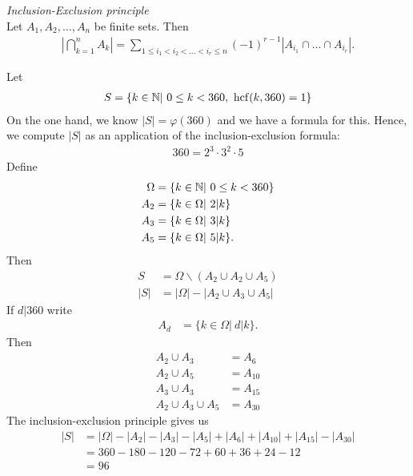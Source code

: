 \begin{pp}
	\emph{Inclusion-Exclusion principle} \\
	Let $A_1, A_2, \dots, A_n$ be finite sets. Then
	\begin{align*}
	\left| \bigcap_{k=1}^n A_k \right| = \sum_{1 \le i_1 < i_2 < \dots < i_r \le n} (-1)^{r-1} \left| A_{i_1} \cap \dots \cap A_{i_r} \right|.
	\end{align*}
\end{pp}


\begin{ex}
	Let 
	\begin{align*}
	S = \{ k \in \mathbb N |~ 0 \le k < 360, ~\operatorname{hcf}(k,360) = 1 \}
	\end{align*}
	On the one hand, we know $|S| = \varphi(360)$ and we have a formula for this. Hence, we compute $|S|$ as an application of the inclusion-exclusion formula:
	\begin{align*}
	360 = 2^3 \cdot 3^2 \cdot 5
	\end{align*}
	Define
	\begin{align*}
	\Omega & = \{k \in \mathbb N|~ 0 \le k < 360 \} \\
	A_2 & = \{ k \in \Omega| ~ 2 |k \} \\
	A_3 & = \{ k \in \Omega| ~ 3 |k \} \\
	A_5 & = \{ k \in \Omega| ~ 5 |k \} .
	\end{align*}
	Then
	\begin{align*}
	S & = \Omega \backslash (A_2 \cup A_2 \cup A_5) \\
	|S| & = |\Omega| - |A_2 \cup A_3 \cup A_5|
	\end{align*}
	If $d|360$ write
	\begin{align*}
	A_d & = \{ k \in \Omega| ~ d |k \} .
	\end{align*}
	Then
	\begin{align*}
	A_2 \cup A_3 & = A_6 \\
	A_2 \cup A_5 & = A_{10} \\
	A_3 \cup A_3 & = A_{15} \\
	A_2 \cup A_3 \cup A_5 & = A_{30} 	
	\end{align*}
	The inclusion-exclusion principle gives us
	\begin{align*}
	|S| & = |\Omega| - |A_2| - |A_3| - |A_5| + |A_6| + |A_{10}| + |A_{15}| - |A_{30}| \\
	& = 360 - 180 - 120 - 72 + 60 + 36 + 24 - 12 \\
	& = 96
	\end{align*}
\end{ex}